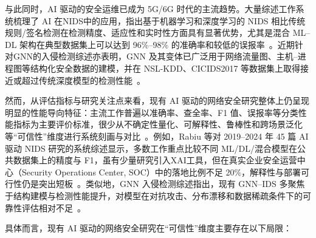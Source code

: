 与此同时，AI 驱动的安全运维已成为 5G/6G 时代的主流趋势。大量综述工作系统梳理了 AI 在NIDS中的应用，指出基于机器学习和深度学习的 NIDS 相比传统规则/签名检测在检测精度、适应性和实时性方面具有显著优势，尤其是混合 ML–DL 架构在典型数据集上可以达到 96\%–98\% 的准确率和较低的误报率~\cite{Habeeb_NIDS_AI_Survey_2022,Rabiu_AIDriven_NIDS_Review_2025,DataDriven_NIDS_Survey_2021}。近期针对GNN的入侵检测综述亦表明，GNN 及其变体已广泛用于网络流量图、主机–进程图等结构化安全数据的建模，并在 NSL-KDD、CICIDS2017 等数据集上取得接近或超过传统深度模型的检测性能~\cite{Zhong_GNN_IDS_Survey_2024,Gao_GNN_IoT_IDS_2023}。

然而，从评估指标与研究关注点来看，现有 AI 驱动的网络安全研究整体上仍呈现明显的性能导向特征：主流工作普遍以准确率、查全率、F1 值、误报率等分类性能指标为主要评价标准，很少从不确定性量化、可解释性、鲁棒性和跨场景泛化等“可信性”维度进行系统刻画与对比~\cite{Rabiu_AIDriven_NIDS_Review_2025,Zhong_GNN_IDS_Survey_2024}。例如，Rabiu 等对 2019–2024 年 45 篇 AI 驱动 NIDS 研究的系统综述显示，多数工作重点比较不同 ML/DL/混合模型在公共数据集上的精度与 F1，虽有少量研究引入XAI工具，但在真实企业安全运营中心（Security Operations Center, SOC）中的落地比例不足 20\%，解释性与部署可行性仍是突出短板~\cite{Rabiu_AIDriven_NIDS_Review_2025}。类似地，GNN 入侵检测综述指出，现有 GNN–IDS 多聚焦于结构建模与检测性能提升，对模型在对抗攻击、分布漂移和数据稀疏条件下的可靠性评估相对不足~\cite{Zhong_GNN_IDS_Survey_2024}。

具体而言，现有 AI 驱动的网络安全研究在“可信性”维度主要存在以下局限：

